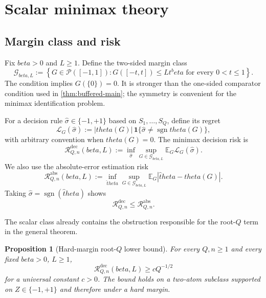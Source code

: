 \documentclass[11pt]{article}
\def\beta{beta}%
\def\theta{theta}%
\newtheorem{proposition}[theorem]{Proposition}
\newcommand{\E}{\mathbb E}
\newcommand{\one}{\mathbf 1}
\newcommand{\sgn}{\operatorname{sgn}}
\newcommand{\calG}{\mathcal G}
\newcommand{\calR}{\mathcal R}
\begin{document}
\section{Scalar minimax theory}
\label{sec:scalar-minimax}

\subsection{Margin class and risk}

Fix $\beta>0$ and $L\ge1$.  Define the two-sided margin class
\begin{equation}
\label{eq:Gclass}
\calG_{\beta,L}
:=
\left\{
G\in\mathcal P([-1,1]):
G([-t,t])\le Lt^\beta
\text{ for every }0<t\le1
\right\}.
\end{equation}
The condition implies $G(\{0\})=0$.  It is stronger than the one-sided comparator condition used in \cref{thm:buffered-main}; the symmetry is convenient for the minimax identification problem.

For a decision rule $\widehat\sigma\in\{-1,+1\}$ based on $S_1,\dots,S_Q$, define its regret
\[
\mathcal L_G(\widehat\sigma)
:=
|\theta(G)|\,
\one\{\widehat\sigma\ne\sgn\theta(G)\},
\]
with arbitrary convention when $\theta(G)=0$.  The minimax decision risk is
\begin{equation}
\label{eq:minimax-decision}
\calR^{\mathrm{dec}}_{Q,n}(\beta,L)
:=
\inf_{\widehat\sigma}
\sup_{G\in\calG_{\beta,L}}
\E_G\mathcal L_G(\widehat\sigma).
\end{equation}
We also use the absolute-error estimation risk
\[
\calR^{\mathrm{abs}}_{Q,n}(\beta,L)
:=
\inf_{\widehat\theta}
\sup_{G\in\calG_{\beta,L}}
\E_G|\widehat\theta-\theta(G)|.
\]
Taking $\widehat\sigma=\sgn(\widehat\theta)$ shows
\begin{equation}
\label{eq:dec-le-abs}
\calR^{\mathrm{dec}}_{Q,n}
\le
\calR^{\mathrm{abs}}_{Q,n}.
\end{equation}

The scalar class already contains the obstruction responsible for the root-$Q$ term in the general theorem.

\begin{proposition}[Hard-margin root-$Q$ lower bound]
\label{thm:rootQ-scalar}
For every $Q,n\ge1$ and every fixed $\beta>0$, $L\ge1$,
\begin{equation}
\label{eq:rootQ-scalar}
\calR^{\mathrm{dec}}_{Q,n}(\beta,L)
\ge cQ^{-1/2}
\end{equation}
for a universal constant $c>0$.  The bound holds on a two-atom subclass supported on $Z\in\{-1,+1\}$ and therefore under a hard margin.
\end{proposition}
\end{document}
